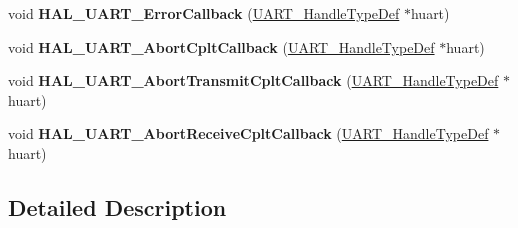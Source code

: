 \begin{DoxyCompactItemize}
\item 
\mbox{\label{group___u_a_r_t___exported___functions___group2_ga0e0456ea96d55db31de947fb3e954f18}} 
void {\bfseries H\+A\+L\+\_\+\+U\+A\+R\+T\+\_\+\+Error\+Callback} (\mbox{\hyperlink{struct_u_a_r_t___handle_type_def}{U\+A\+R\+T\+\_\+\+Handle\+Type\+Def}} $\ast$huart)
\item 
\mbox{\label{group___u_a_r_t___exported___functions___group2_gacdcb274a742093c45869f2cfbb0a8b09}} 
void {\bfseries H\+A\+L\+\_\+\+U\+A\+R\+T\+\_\+\+Abort\+Cplt\+Callback} (\mbox{\hyperlink{struct_u_a_r_t___handle_type_def}{U\+A\+R\+T\+\_\+\+Handle\+Type\+Def}} $\ast$huart)
\item 
\mbox{\label{group___u_a_r_t___exported___functions___group2_gacf94995fb9986930151f3c5586d37e5c}} 
void {\bfseries H\+A\+L\+\_\+\+U\+A\+R\+T\+\_\+\+Abort\+Transmit\+Cplt\+Callback} (\mbox{\hyperlink{struct_u_a_r_t___handle_type_def}{U\+A\+R\+T\+\_\+\+Handle\+Type\+Def}} $\ast$huart)
\item 
\mbox{\label{group___u_a_r_t___exported___functions___group2_ga0f9d15c5ae7b69f09e0ee5f2461e7e7a}} 
void {\bfseries H\+A\+L\+\_\+\+U\+A\+R\+T\+\_\+\+Abort\+Receive\+Cplt\+Callback} (\mbox{\hyperlink{struct_u_a_r_t___handle_type_def}{U\+A\+R\+T\+\_\+\+Handle\+Type\+Def}} $\ast$huart)
\end{DoxyCompactItemize}


\subsection{Detailed Description}
